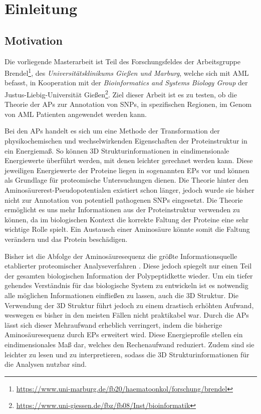 \chapter{Einleitung}
\label{cha:Einleitung}

\section{Motivation}

Die vorliegende Masterarbeit ist Teil des Forschungsfeldes der Arbeitsgruppe Brendel\footnote{\url{https://www.uni-marburg.de/fb20/haematoonkol/forschung/brendel}}, des \emph{Universitätsklinikums Gießen und Marburg}, welche sich mit \ac{AML} befasst, in Kooperation mit der \emph{Bioinformatics and Systems Biology Group} der Justus-Liebig-Universität Gießen\footnote{\url{https://www.uni-giessen.de/fbz/fb08/Inst/bioinformatik}}. Ziel dieser Arbeit ist es zu testen, ob die Theorie der \ac{APs} zur Annotation von \ac{SNP}s, in spezifischen Regionen, im Genom von \ac{AML} Patienten angewendet werden kann.

Bei den \ac{APs} handelt es sich um eine Methode der Transformation der physikochemischen und wechselwirkenden Eigenschaften der Proteinstruktur in ein Energiemaß. So können 3D Strukturinformationen in eindimensionale Energiewerte überführt werden, mit denen leichter gerechnet werden kann. Diese jeweiligen Energiewerte der Proteine liegen in sogenannten \ac{EP}s vor und können als Grundlage für proteomische Untersuchungen dienen. Die Theorie hinter den Aminosäurerest-Pseudopotentialen existiert schon länger, jedoch wurde sie bisher nicht zur Annotation von potentiell pathogenen \ac{SNP}s eingesetzt. Die Theorie ermöglicht es uns mehr Informationen aus der Proteinstruktur verwenden zu können, da im biologischen Kontext die korrekte Faltung der Proteine eine sehr wichtige Rolle spielt. Ein Austausch einer Aminosäure könnte somit die Faltung verändern und das Protein beschädigen. 

Bisher ist die Abfolge der Aminosäuresequenz die größte Informationsquelle etablierter proteomischer Analyseverfahren \cite{Landels.2015}. Diese jedoch spiegelt nur einen Teil der gesamten biologischen Information der Polypeptidkette wieder. Um ein tiefer gehendes Verständnis für das biologische System zu entwickeln ist es notwendig alle möglichen Informationen einfließen zu lassen, auch die 3D Struktur. Die Verwendung der 3D Struktur führt jedoch zu einem drastisch erhöhten Aufwand, weswegen es bisher in den meisten Fällen nicht praktikabel war. Durch die \ac{APs} lässt sich dieser Mehraufwand erheblich verringert, indem die bisherige Aminosäuresequenz durch \ac{EP}s erweitert wird. Diese Energieprofile stellen ein eindimensionales Maß dar, welches den Rechenaufwand reduziert. Zudem sind sie leichter zu lesen und zu interpretieren, sodass die 3D Strukturinformationen für die Analysen nutzbar sind.

